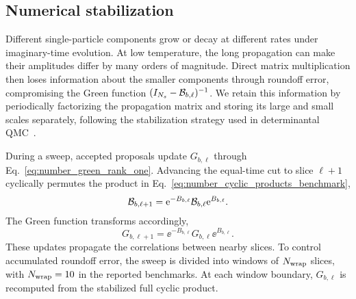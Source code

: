 \subsection{Numerical stabilization}
\label{app:stabilization_number}

Different single-particle components grow or decay at different rates under imaginary-time evolution. At low temperature, the long propagation can make their amplitudes differ by many orders of magnitude. Direct matrix multiplication then loses information about the smaller components through roundoff error, compromising the Green function $(I_{N_s}-\mathcal{B}_{b,\ell})^{-1}$. We retain this information by periodically factorizing the propagation matrix and storing its large and small scales separately, following the stabilization strategy used in determinantal QMC~\cite{assaadEvertz2008}.

During a sweep, accepted proposals update $G_{b,\ell}$ through Eq.~\eqref{eq:number_green_rank_one}. Advancing the equal-time cut to slice $\ell+1$ cyclically permutes the product in Eq.~\eqref{eq:number_cyclic_products_benchmark},
\begin{equation}
    \mathcal{B}_{b,\ell+1}=\mathrm{e}^{-B_{b,\ell}}\mathcal{B}_{b,\ell}\mathrm{e}^{B_{b,\ell}}.
\end{equation}
The Green function transforms accordingly,
\begin{equation}
    G_{b,\ell+1}=\ee^{-B_{b,\ell}}G_{b,\ell}\ee^{B_{b,\ell}}.
    \label{eq:number_wrap_similarity}
\end{equation}
These updates propagate the correlations between nearby slices. To control accumulated roundoff error, the sweep is divided into windows of $N_{\rm wrap}$ slices, with $N_{\rm wrap}=10$ in the reported benchmarks. At each window boundary, $G_{b,\ell}$ is recomputed from the stabilized full cyclic product.

